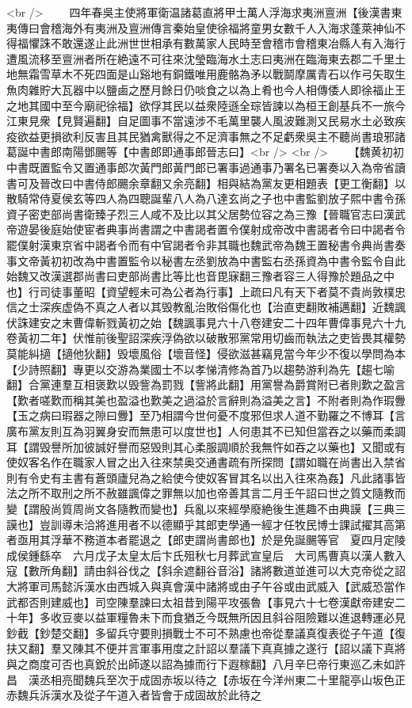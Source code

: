 <br />
　　四年春吳主使將軍衛温諸葛直將甲士萬人浮海求夷洲亶洲【後漢書東夷傳曰會稽海外有夷洲及亶洲傳言秦始皇使徐福將童男女數千人入海求蓬萊神仙不得福懼誅不敢還遂止此洲世世相承有數萬家人民時至會稽市會稽東冶縣人有入海行遭風流移至亶洲者所在絶遠不可往來沈瑩臨海水土志曰夷洲在臨海東去郡二千里土地無霜雪草木不死四面是山谿地有銅鐵唯用鹿骼為矛以戰鬬摩厲青石以作弓矢取生魚肉雜貯大瓦器中以鹽鹵之歷月餘日仍啖食之以為上肴也今人相傳倭人即徐福止王之地其國中至今廟祀徐福】欲俘其民以益衆陸遜全琮皆諫以為桓王創基兵不一旅今江東見衆【見賢遍翻】自足圖事不當遠涉不毛萬里襲人風波難測又民易水土必致疾疫欲益更損欲利反害且其民猶禽獸得之不足濟事無之不足虧衆吳主不聽尚書琅邪諸葛誕中書郎南陽鄧颺等【中書郎即通事郎晉志曰】<br />
<br />
　　【魏黄初初中書既置監令又置通事郎次黃門郎黃門郎已署事過通事乃署名已署奏以入為帝省讀書可及晉改曰中書侍郎颺余章翻又余亮翻】相與結為黨友更相題表【更工衡翻】以散騎常侍夏侯玄等四人為四聰誕輩八人為八達玄尚之子也中書監劉放子熙中書令孫資子密吏部尚書衛臻子烈三人咸不及比以其父居勢位容之為三豫【晉職官志曰漢武帝遊晏後庭始使宦者典事尚書謂之中書謁者置令僕射成帝改中書謁者令曰中謁者令罷僕射漢東京省中謁者令而有中官謁者令非其職也魏武帝為魏王置秘書令典尚書奏事文帝黃初初改為中書置監令以秘書左丞劉放為中書監右丞孫資為中書令監令自此始魏又改漢選郡尚書曰吏部尚書比等比也音毘寐翻三豫者容三人得豫於題品之中也】行司徒事董昭【資望輕未可為公者為行事】上疏曰凡有天下者莫不貴尚敦樸忠信之士深疾虚偽不真之人者以其毁教亂治敗俗傷化也【治直吏翻敗補邁翻】近魏諷伏誅建安之末曹偉斬戮黃初之始【魏諷事見六十八卷建安二十四年曹偉事見六十九卷黃初二年】伏惟前後聖詔深疾浮偽欲以破散邪黨常用切齒而執法之吏皆畏其權勢莫能糾擿【擿他狄翻】毁壞風俗【壞音怪】侵欲滋甚竊見當今年少不復以學問為本【少詩照翻】專更以交游為業國士不以孝悌清修為首乃以趨勢游利為先【趨七喻翻】合黨連羣互相褒歎以毁訾為罰戮【訾將此翻】用黨譽為爵賞附已者則歎之盈言【歎者嗟歎而稱其美也盈溢也歎美之過溢於言辭則為溢美之言】不附者則為作瑕釁【玉之病曰瑕器之隙曰釁】至乃相謂今世何憂不度邪但求人道不勤羅之不博耳【言廣布黨友則互為羽翼身安而無患可以度世也】人何患其不已知但當吞之以藥而柔調耳【謂毁譽所加彼誠好譽而惡毁則其心柔服調順於我無忤如吞之以藥也】又聞或有使奴客名作在職家人冒之出入往來禁奥交通書疏有所探問【謂如職在尚書出入禁省則有令史有主書有蒼頭廬兒為之給使今使奴客冒其名以出入往來為姦】凡此諸事皆法之所不取刑之所不赦雖諷偉之罪無以加也帝善其言二月壬午詔曰世之質文隨教而變【謂殷尚質周尚文各隨教而變也】兵亂以來經學廢絶後生進趣不由典謨【三典三謨也】豈訓導未洽將進用者不以德顯乎其郎吏學通一經才任牧民博士課試擢其高第者亟用其浮華不務道本者罷退之【郎吏謂尚書郎也】於是免誕颺等官　夏四月定陵成侯鍾繇卒　六月戊子太皇太后卞氏殂秋七月葬武宣皇后　大司馬曹真以漢人數入寇【數所角翻】請由斜谷伐之【斜余遮翻谷音浴】諸將數道並進可以大克帝從之詔大將軍司馬懿泝漢水由西城入與真會漢中諸將或由子午谷或由武威入【武威恐當作武都否則建威也】司空陳羣諫曰太祖昔到陽平攻張魯【事見六十七卷漢獻帝建安二十年】多收豆麥以益軍糧魯未下而食猶乏今既無所因且斜谷阻險難以進退轉運必見鈔截【鈔楚交翻】多留兵守要則損戰士不可不熟慮也帝從羣議真復表從子午道【復扶又翻】羣又陳其不便并言軍事用度之計詔以羣議下真真據之遂行【詔以議下真將與之商度可否也真銳於出師遂以詔為據而行下遐稼翻】八月辛巳帝行東巡乙未如許昌　漢丞相亮聞魏兵至次于成固赤坂以待之【赤坂在今洋州東二十里龍亭山坂色正赤魏兵泝漢水及從子午道入者皆會于成固故於此待之